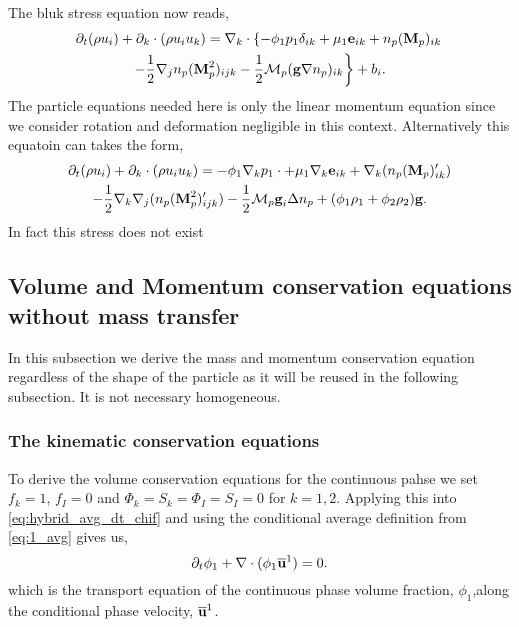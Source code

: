 The bluk stress equation now reads, 
\begin{multline}
    \partial_t (\rho u_i)
    + \partial_k \cdot (\rho u_i u_k)
    = 
    \mathbf{\nabla}_k\cdot
    \left\{
    - \phi_1 p_1 \delta_{ik} 
    + \mu_1 \textbf{e}_{ik}
    + n_p (\textbf{M}_p)_{ik}
    \right. \\ \left. 
    - \frac{1}{2}\nabla_j n_p (\textbf{M}_p^2)_{ijk}
    - \frac{1}{2}\mathcal{M}_p  (\textbf{g} \nabla n_p)_{ik}    
    \right\}
    + b_i. 
\end{multline}
The particle equations needed here is only the linear momentum equation since we consider rotation and deformation  negligible in this context. 
Alternatively this equatoin can takes the form, 
\begin{multline}
    \partial_t (\rho u_i)
    + \partial_k \cdot (\rho u_i u_k)
    = 
    - \phi_1 \mathbf{\nabla}_k p_1\cdot
    + \mu_1 \mathbf{\nabla}_k \textbf{e}_{ik}
    + \mathbf{\nabla}_k (n_p (\textbf{M}_p )'_{ik})\\
    - \frac{1}{2}\nabla_k\nabla_j (n_p (\textbf{M}_p^2)'_{ijk})
    - \frac{1}{2}\mathcal{M}_p  \textbf{g}_i \Delta n_p 
    + (\phi_1 \rho_1 + \phi_2 \rho_2 )\textbf{g}. 
\end{multline}
In fact this stress does not exist
\subsection{Volume and Momentum conservation equations without mass transfer}

In this subsection we derive the mass and momentum conservation equation regardless of the shape of the particle as it will be reused in the following subsection. 
It is not necessary homogeneous. 
\subsubsection{The kinematic conservation equations}

To derive the volume conservation equations for the continuous pahse we set $f_{k} = 1$, $f_I = 0$ and  $\Phi_{k} = S_{k} =\Phi_{I} = S_{I} = 0$ for $k=1,2$. 
Applying this into \ref{eq:hybrid_avg_dt_chif} and using the conditional average definition from \ref{eq:1_avg} gives us,
\begin{equation}
    \partial_t \phi_1
    + \mathbf{\nabla} \cdot (\phi_1 \overline{\textbf{u}}^1)
    = 0.
    \label{eq:hybrid_avg_dt_chi}
\end{equation}
which is the transport equation of the continuous phase volume fraction, $\phi_1$,along the conditional phase velocity, $\overline{\textbf{u}}^1$. 

